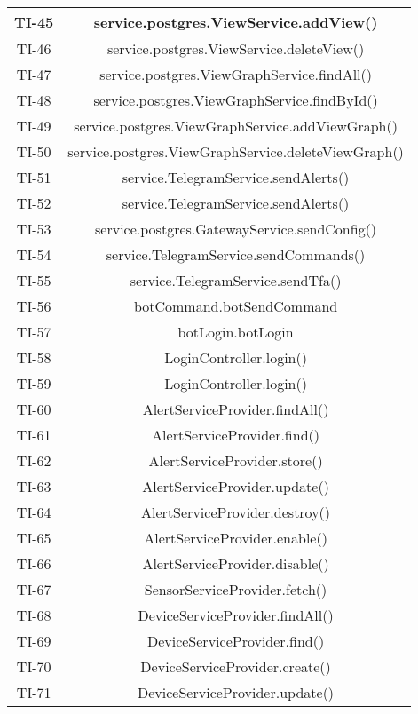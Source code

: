 \begin{center}
\begin{longtable}{|c|c|}
			\hline
			TI-45 & service.postgres.ViewService.addView() \\
			\hline
			TI-46 & service.postgres.ViewService.deleteView() \\
			\hline
			TI-47 & service.postgres.ViewGraphService.findAll() \\
			\hline
			TI-48 & service.postgres.ViewGraphService.findById() \\
			\hline
			TI-49 & service.postgres.ViewGraphService.addViewGraph() \\
			\hline
			TI-50 & service.postgres.ViewGraphService.deleteViewGraph() \\
			\hline
			TI-51 & service.TelegramService.sendAlerts() \\
			\hline
			TI-52 & service.TelegramService.sendAlerts() \\
			\hline
			TI-53 & service.postgres.GatewayService.sendConfig() \\
			\hline
			TI-54 & service.TelegramService.sendCommands() \\
			\hline
			TI-55 & service.TelegramService.sendTfa() \\
			\hline
			TI-56 & botCommand.botSendCommand \\
			\hline
			TI-57 & botLogin.botLogin \\
			\hline
			TI-58 & LoginController.login() \\
			\hline
			TI-59 & LoginController.login() \\
			\hline
			TI-60 & AlertServiceProvider.findAll() \\
			\hline
			TI-61 & AlertServiceProvider.find() \\
			\hline
			TI-62 & AlertServiceProvider.store() \\
			\hline
			TI-63 & AlertServiceProvider.update() \\
			\hline
			TI-64 & AlertServiceProvider.destroy() \\
			\hline
			TI-65 & AlertServiceProvider.enable() \\
			\hline
			TI-66 & AlertServiceProvider.disable() \\
			\hline
			TI-67 & SensorServiceProvider.fetch() \\
			\hline
			TI-68 & DeviceServiceProvider.findAll() \\
			\hline
			TI-69 & DeviceServiceProvider.find() \\
			\hline
			TI-70 & DeviceServiceProvider.create() \\
			\hline
			TI-71 & DeviceServiceProvider.update() \\

\end{longtable}
\end{center}
